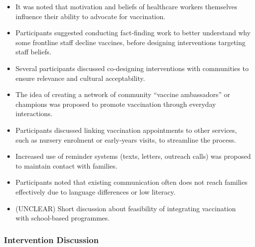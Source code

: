 \documentclass{article}
\begin{document}
\begin{itemize}
    \item It was noted that motivation and beliefs of healthcare workers themselves influence their ability to advocate for vaccination.
    \item Participants suggested conducting fact‑finding work to better understand why some frontline staff decline vaccines, before designing interventions targeting staff beliefs.
    \item Several participants discussed co‑designing interventions with communities to ensure relevance and cultural acceptability.
    \item The idea of creating a network of community “vaccine ambassadors” or champions was proposed to promote vaccination through everyday interactions.
    \item Participants discussed linking vaccination appointments to other services, such as nursery enrolment or early‑years visits, to streamline the process.
    \item Increased use of reminder systems (texts, letters, outreach calls) was proposed to maintain contact with families.
    \item Participants noted that existing communication often does not reach families effectively due to language differences or low literacy.
    \item (UNCLEAR) Short discussion about feasibility of integrating vaccination with school‑based programmes.
\end{itemize}

\subsubsection{Intervention Discussion}
\end{document}

